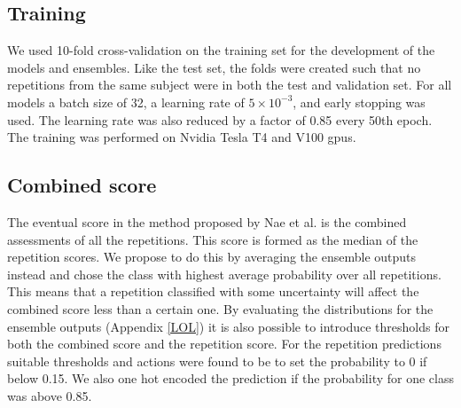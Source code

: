 
\subsection{Training} \label{sec:met-training}
We used 10-fold cross-validation on the training set for the development of the models and ensembles. Like the test set, the folds were created such that no repetitions from the same subject were in both the test and validation set. For all models a batch size of 32, a learning rate of $5 \times 10^{-3}$, and early stopping was used. The learning rate was also reduced by a factor of 0.85 every 50th epoch. The training was performed on Nvidia Tesla T4 and V100 \glspl{gpu}.


\subsection{Combined score}
The eventual score in the method proposed by Nae et al. \cite{Nae2020b} is the combined assessments of all the repetitions. This score is formed as the median of the repetition scores. We propose to do this by averaging the ensemble outputs instead and chose the class with highest average probability over all repetitions. This means that a repetition classified with some uncertainty will affect the combined score less than a certain one. By evaluating the distributions for the ensemble outputs (Appendix \ref{LOL}) it is also possible to introduce thresholds for both the combined score and the repetition score. For the repetition predictions suitable thresholds and actions were found to be to set the probability to 0 if below 0.15. We also one hot encoded the prediction if the probability for one class was above 0.85.
